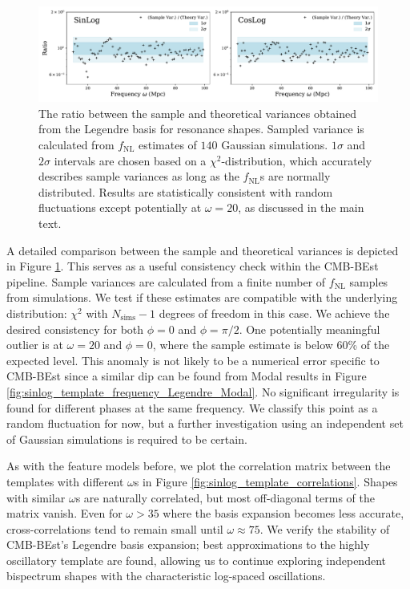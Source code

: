 \begin{figure}[htbp!] 
	\centering    
	\includegraphics[width=\textwidth]{sinlog_template_frequency_variances_Legendre.pdf}
	\caption{The ratio between the sample and theoretical variances obtained from the Legendre basis for resonance shapes. Sampled variance is calculated from $f_\text{NL}$ estimates of $140$ Gaussian simulations. $1\sigma$ and $2\sigma$ intervals are chosen based on a $\chi^2$-distribution, which accurately describes sample variances as long as the $f_\text{NL}$s are normally distributed. Results are statistically consistent with random fluctuations except potentially at $\omega=20$, as discussed in the main text.}
	\label{fig:sinlog_template_frequency_variances_Legendre}
\end{figure}

A detailed comparison between the sample and theoretical variances is depicted in Figure \ref{fig:sinlog_template_frequency_variances_Legendre}. This serves as a useful consistency check within the CMB-BEst pipeline. Sample variances are calculated from a finite number of $f_\text{NL}$ samples from simulations. We test if these estimates are compatible with the underlying distribution: $\chi^2$ with $N_\text{sims}-1$ degrees of freedom in this case. We achieve the desired consistency for both $\phi=0$ and $\phi=\pi/2$. One potentially meaningful outlier is at $\omega=20$ and $\phi=0$, where the sample estimate is below 60\% of the expected level. This anomaly is not likely to be a numerical error specific to CMB-BEst since a similar dip can be found from Modal results in Figure \ref{fig:sinlog_template_frequency_Legendre_Modal}. No significant irregularity is found for different phases at the same frequency. We classify this point as a random fluctuation for now, but a further investigation using an independent set of Gaussian simulations is required to be certain.

As with the feature models before, we plot the correlation matrix between the templates with different $\omega$s in Figure \ref{fig:sinlog_template_correlations}. Shapes with similar $\omega$s are naturally correlated, but most off-diagonal terms of the matrix vanish. Even for $\omega > 35$ where the basis expansion becomes less accurate, cross-correlations tend to remain small until $\omega \approx 75$. We verify the stability of CMB-BEst's Legendre basis expansion; best approximations to the highly oscillatory template are found, allowing us to continue exploring independent bispectrum shapes with the characteristic log-spaced oscillations.

